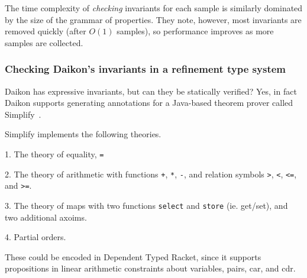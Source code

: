 The time complexity of \emph{checking} invariants for each sample
is similarly dominated by the size of the grammar of properties.
They note, however, most invariants are removed quickly (after
$O(1)$ samples), so performance improves as more samples
are collected.

\subsubsection{Checking Daikon's invariants in a refinement type system}

Daikon has expressive invariants, but can they be statically verified?
Yes, in fact Daikon supports generating annotations for a Java-based
theorem prover called Simplify~\cite{Detlefs03simplifya}.

Simplify implements the following theories.

1. The theory of equality, \texttt{=}

2. The theory of arithmetic with functions \texttt{+}, \texttt{*}, \texttt{-},
   and relation symbols \texttt{>}, \texttt{<}, \texttt{<=}, and \texttt{>=}.

3. The theory of maps with two functions \texttt{select} and \texttt{store} (ie. get/set),
   and two additional axoims.

4. Partial orders. %

These could be encoded in Dependent Typed Racket, since it supports propositions
in linear arithmetic constraints about variables, pairs, car, and cdr.


